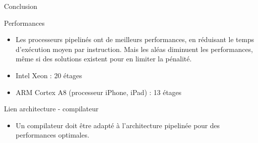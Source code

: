 %
\begin{Frame}{Conclusion}

\begin{block}{Performances}
       \begin{center}
 	\begin{itemize}
         \item Les processeurs pipelinés ont de meilleurs performances, en réduisant le temps d'exécution moyen par instruction. Mais les aléas diminuent les performances, même si des solutions existent pour en limiter la pénalité.
	\item Intel Xeon : 20 étages
	\item ARM Cortex A8 (processeur iPhone, iPad) : 13 étages
        \end{itemize}
       \end{center}
      \end{block}   

\begin{block}{Lien architecture - compilateur}
       \begin{center}
 	\begin{itemize}
         \item Un compilateur doit être adapté à l'architecture pipelinée pour des performances optimales.
        \end{itemize}
       \end{center}
      \end{block}   


\end{Frame}


